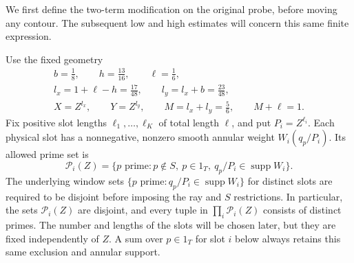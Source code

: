 We first define the two-term modification on the original probe, before
moving any contour.  The subsequent low and high estimates will concern
this same finite expression.

Use the fixed geometry
\begin{equation}
 \begin{gathered}
 b=\frac18,\qquad h=\frac{13}{16},\qquad \ell=\frac16,\\
 l_x=1+\ell-h=\frac{17}{48},\qquad
 l_y=l_x+b=\frac{23}{48},\\
 X=Z^{l_x},\qquad Y=Z^{l_y},\qquad
 M=l_x+l_y=\frac56,\qquad M+\ell=1.
 \end{gathered}
 \label{old-eq:5.1}
\end{equation}
Fix positive slot lengths $\ell_1,\ldots,\ell_K$ of total length
$\ell$, and put $P_i=Z^{\ell_i}$.  Each physical slot has a
nonnegative, nonzero smooth annular weight $W_i(q_p/P_i)$.  Its allowed
prime set is
\[
 \mathcal P_i(Z)=\{p\text{ prime}:p\notin S,\ p\in1_T,
                         \ q_p/P_i\in\operatorname{supp}W_i\}.
\]
The underlying window sets
$\{p\text{ prime}:q_p/P_i\in\operatorname{supp}W_i\}$ for distinct slots
are required to be disjoint before imposing the ray and $S$ restrictions.
In particular, the sets $\mathcal P_i(Z)$ are disjoint, and every tuple in
$\prod_i\mathcal P_i(Z)$ consists of distinct primes.
The number and lengths of the slots will be chosen later, but they are
fixed independently of $Z$.  A sum over $p\in1_T$ for slot $i$ below
always retains this same exclusion and annular support.

